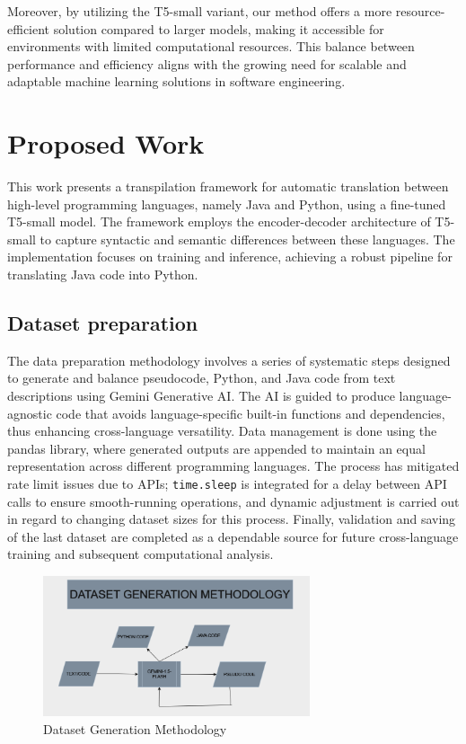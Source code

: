 \documentclass{dhbenelux}
\begin{document}
Moreover, by utilizing the T5-small variant, our method offers a more resource-efficient solution compared to larger models, making it accessible for environments with limited computational resources. This balance between performance and efficiency aligns with the growing need for scalable and adaptable machine learning solutions in software engineering.

\section{Proposed Work}

This work presents a transpilation framework for automatic translation between high-level programming languages, namely Java and Python, using a fine-tuned T5-small model. The framework employs the encoder-decoder architecture of T5-small to capture syntactic and semantic differences between these languages. The implementation focuses on training and inference, achieving a robust pipeline for translating Java code into Python.

\subsection{Dataset preparation}
The data preparation methodology involves a series of systematic steps designed to generate and balance pseudocode, Python, and Java code from text descriptions using Gemini Generative AI. The AI is guided to produce language-agnostic code that avoids language-specific built-in functions and dependencies, thus enhancing cross-language versatility. Data management is done using the pandas library, where generated outputs are appended to maintain an equal representation across different programming languages. The process has mitigated rate limit issues due to APIs; \texttt{time.sleep} is integrated for a delay between API calls to ensure smooth-running operations, and dynamic adjustment is carried out in regard to changing dataset sizes for this process. Finally, validation and saving of the last dataset are completed as a dependable source for future cross-language training and subsequent computational analysis.

\begin{figure}[h!]
\centering
\includegraphics[width=0.7\textwidth]{dataset_methodology.png} %
\caption{Dataset Generation Methodology}
\label{fig:dataset-methodology}
\end{figure}
\end{document}
